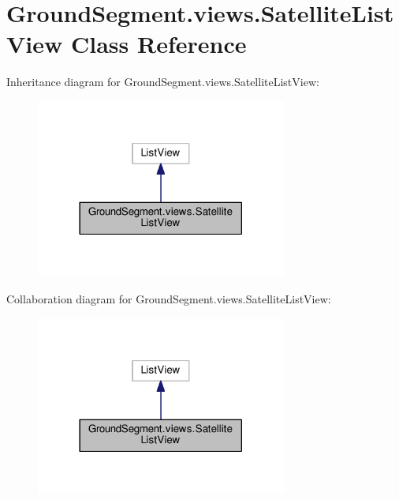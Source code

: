 \hypertarget{class_ground_segment_1_1views_1_1_satellite_list_view}{}\section{Ground\+Segment.\+views.\+Satellite\+List\+View Class Reference}
\label{class_ground_segment_1_1views_1_1_satellite_list_view}


Inheritance diagram for Ground\+Segment.\+views.\+Satellite\+List\+View\+:\nopagebreak
\begin{figure}[H]
\begin{center}
\leavevmode
\includegraphics[width=234pt]{class_ground_segment_1_1views_1_1_satellite_list_view__inherit__graph}
\end{center}
\end{figure}


Collaboration diagram for Ground\+Segment.\+views.\+Satellite\+List\+View\+:\nopagebreak
\begin{figure}[H]
\begin{center}
\leavevmode
\includegraphics[width=234pt]{class_ground_segment_1_1views_1_1_satellite_list_view__coll__graph}
\end{center}
\end{figure}
